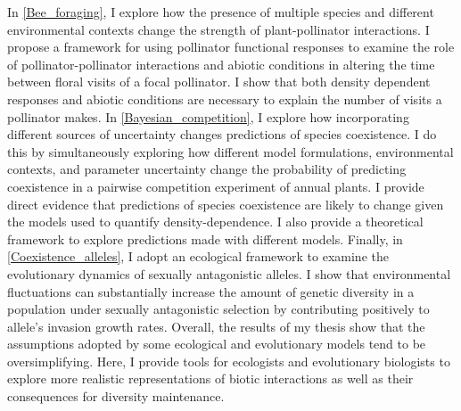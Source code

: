 In \autoref{Bee_foraging}, I explore how the presence of multiple species and different environmental contexts change the strength of plant-pollinator interactions. I propose a framework for using pollinator functional responses to examine the role of pollinator-pollinator interactions and abiotic conditions in altering the time between floral visits of a focal pollinator. I show that both density dependent responses and abiotic conditions are necessary to explain the number of visits a pollinator makes. In \autoref{Bayesian_competition},  I explore how incorporating different sources of uncertainty changes predictions of species coexistence. I do this by simultaneously exploring how different model formulations, environmental contexts, and parameter uncertainty change the probability of predicting coexistence in a pairwise competition experiment of annual plants. I provide direct evidence that predictions of species coexistence are likely to change given the models used to quantify density-dependence. I also provide a theoretical framework to explore predictions made with different models. Finally, in \autoref{Coexistence_alleles}, I adopt an ecological framework to examine the evolutionary dynamics of sexually antagonistic alleles. I show that environmental fluctuations can substantially increase the amount of genetic diversity in a population under sexually antagonistic selection by contributing positively to allele's invasion growth rates. Overall, the results of my thesis show that the assumptions adopted by some ecological and evolutionary models tend to be oversimplifying. Here, I provide tools for ecologists and evolutionary biologists to explore  more realistic representations of biotic interactions as well as their consequences for diversity maintenance.
